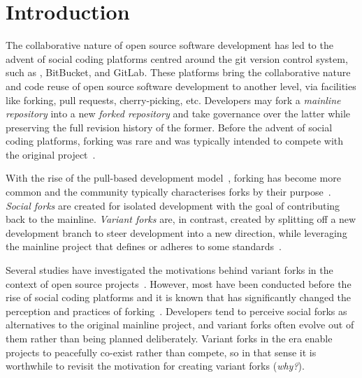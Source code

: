 \section{Introduction}
\label{sec:intro}

The collaborative nature of open source software development has led to the advent of social coding platforms centred around the git version control system, such as \gh, BitBucket, and GitLab.
These platforms bring the collaborative nature and code reuse of open source software development to another level, via facilities like forking, pull requests, cherry-picking, etc.
Developers may fork a \textit{mainline repository} into a new \textit{forked repository} and take governance over the latter while preserving the full revision history of the former.
Before the advent of social coding platforms, forking was rare and was typically intended to compete with the original project~\cite{Linus:2012Perspectives,Gregorio:2012,Viseur:2012Forks,Linus:2013CodeForking,Linus:2011ToFork,Gamalielsson:2014Sustainability}.

With the rise of the pull-based development model~\cite{Gousios:2014ICSE}, forking has become more common and the community typically characterises forks by their purpose~\cite{Zhou:2020}.
\textit{Social forks} are created for isolated development with the goal of contributing back to the mainline.
\textit{Variant forks} are, in contrast, created by splitting off a new development branch
to steer development into a new direction, while leveraging the mainline project that defines or adheres to some standards~\cite{sung:ICSE:2020}.

Several studies have investigated the motivations behind variant forks in the context of open source projects~\cite{Linus:2012Perspectives,Gregorio:2012,Viseur:2012Forks,Linus:2013CodeForking,Linus:2011ToFork,Gamalielsson:2014Sustainability}.
However, most have been conducted before the rise of social coding platforms and it is known that \gh has significantly changed the perception and practices of forking~\cite{Zhou:2020}.
Developers tend to perceive social forks as alternatives to the original mainline project, and variant forks often evolve out of them rather than being planned deliberately.
Variant forks in the \gh era enable projects to peacefully co-exist rather than compete, so in that sense it is worthwhile to revisit the motivation for creating variant forks (\textit{why?}).

